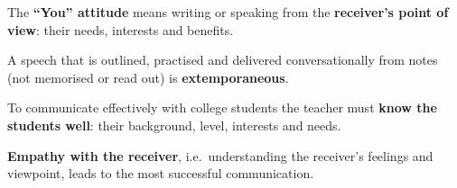The \textbf{``You'' attitude} means writing or speaking from the \textbf{receiver's point of view}: their needs, interests and benefits.

A speech that is outlined, practised and delivered conversationally from notes (not memorised or read out) is \textbf{extemporaneous}.

To communicate effectively with college students the teacher must \textbf{know the students well}: their background, level, interests and needs.

\textbf{Empathy with the receiver}, i.e.\ understanding the receiver's feelings and viewpoint, leads to the most successful communication.
